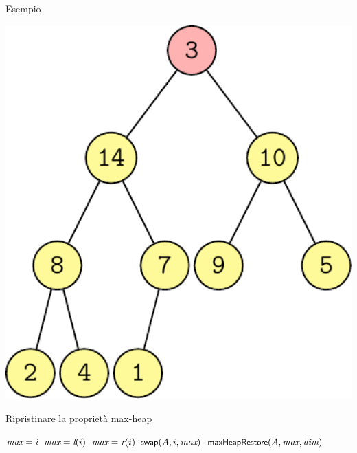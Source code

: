 \begin{frame}{Esempio}
\begin{overprint}[0.5\textwidth]
\includegraphics[width=1.0\textwidth,page=7]{esempio-errato.pdf}
\end{overprint}

\end{frame}    

\begin{frame}{Ripristinare la proprietà max-heap}

\vspace{-9pt}
\begin{Procedure}
\caption[A]{\maxheapify($\Item[\,]\ A$, \INTEGER $i$, \INTEGER \heapcount)}

\INTEGER $\textit{max} = i$\;
{
  $\textit{max} = \textit{l}(i)$
}
{
  $\textit{max} = \textit{r}(i)$
}
{
  $\textsf{{\small swap}}(A,i,\textit{max})$\;
  $\textsf{{\small maxHeapRestore}}(A, \textit{max}, \textit{dim})$\;
}
\end{Procedure}



\end{frame}

